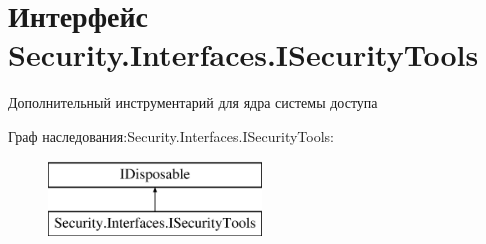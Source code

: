 \hypertarget{interface_security_1_1_interfaces_1_1_i_security_tools}{}\section{Интерфейс Security.\+Interfaces.\+I\+Security\+Tools}
\label{interface_security_1_1_interfaces_1_1_i_security_tools}


Дополнительный инструментарий для ядра системы доступа  


Граф наследования\+:Security.\+Interfaces.\+I\+Security\+Tools\+:\begin{figure}[H]
\begin{center}
\leavevmode
\includegraphics[height=2.000000cm]{d4/df5/interface_security_1_1_interfaces_1_1_i_security_tools}
\end{center}
\end{figure}
